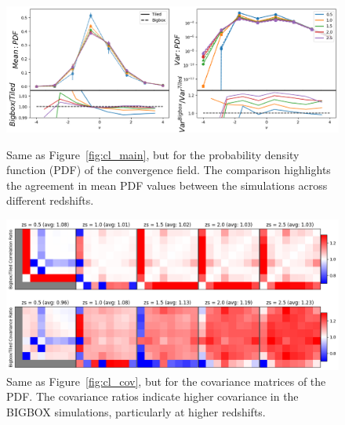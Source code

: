 \begin{figure}[p]
    \centering
    \includegraphics[width=\textwidth]{figures/results/pdf_main.png}
    \caption{Same as Figure~\ref{fig:cl_main}, but for the probability density function (PDF) of the convergence field. The comparison highlights the agreement in mean PDF values between the simulations across different redshifts.}
    \label{fig:pdf_main}
    \vspace{2cm}
    \includegraphics[width=\textwidth]{figures/results/pdf_cov.png}
    \caption{Same as Figure~\ref{fig:cl_cov}, but for the covariance matrices of the PDF. The covariance ratios indicate higher covariance in the BIGBOX simulations, particularly at higher redshifts.}
    \label{fig:pdf_cov}
\end{figure}

